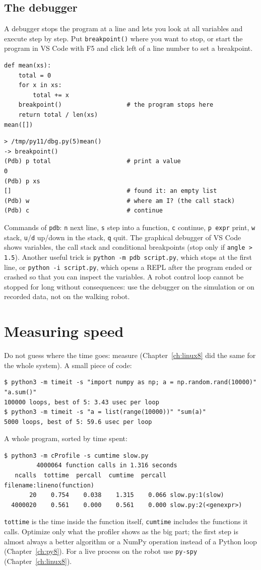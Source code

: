 \subsection*{The debugger}
A debugger stops the program at a line and lets you look at all variables and execute step by step. Put \texttt{breakpoint()} where you want to stop, or start the program in VS Code with F5 and click left of a line number to set a breakpoint.
\begin{verbatim}
def mean(xs):
    total = 0
    for x in xs:
        total += x
    breakpoint()                  # the program stops here
    return total / len(xs)
mean([])
\end{verbatim}
\begin{verbatim}
> /tmp/py11/dbg.py(5)mean()
-> breakpoint()
(Pdb) p total                     # print a value
0
(Pdb) p xs
[]                                # found it: an empty list
(Pdb) w                           # where am I? (the call stack)
(Pdb) c                           # continue
\end{verbatim}
Commands of \texttt{pdb}: \texttt{n} next line, \texttt{s} step into a function, \texttt{c} continue, \texttt{p expr} print, \texttt{w} stack, \texttt{u}/\texttt{d} up/down in the stack, \texttt{q} quit. The graphical debugger of VS Code shows variables, the call stack and conditional breakpoints (stop only if \texttt{angle > 1.5}). Another useful trick is \verb!python -m pdb script.py!, which stops at the first line, or \verb!python -i script.py!, which opens a REPL after the program ended or crashed so that you can inspect the variables. A robot control loop cannot be stopped for long without consequences: use the debugger on the simulation or on recorded data, not on the walking robot.

\section*{Measuring speed}
Do not guess where the time goes: measure (Chapter~\ref{ch:linux8} did the same for the whole system). A small piece of code:
\begin{verbatim}
$ python3 -m timeit -s "import numpy as np; a = np.random.rand(10000)" "a.sum()"
100000 loops, best of 5: 3.43 usec per loop
$ python3 -m timeit -s "a = list(range(10000))" "sum(a)"
5000 loops, best of 5: 59.6 usec per loop
\end{verbatim}
A whole program, sorted by time spent:
\begin{verbatim}
$ python3 -m cProfile -s cumtime slow.py
         4000064 function calls in 1.316 seconds
   ncalls  tottime  percall  cumtime  percall filename:lineno(function)
       20    0.754    0.038    1.315    0.066 slow.py:1(slow)
  4000020    0.561    0.000    0.561    0.000 slow.py:2(<genexpr>)
\end{verbatim}
\texttt{tottime} is the time inside the function itself, \texttt{cumtime} includes the functions it calls. Optimize only what the profiler shows as the big part; the first step is almost always a better algorithm or a NumPy operation instead of a Python loop (Chapter~\ref{ch:py8}). For a live process on the robot use \texttt{py-spy} (Chapter~\ref{ch:linux8}).

